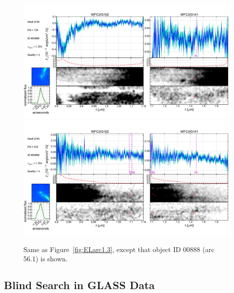 \begin{figure}
    \centering
    \includegraphics[width=\textwidth]{fig/clA2744_id888_pa135_zsQ3.pdf}\\
    \includegraphics[width=\textwidth]{fig/clA2744_id888_pa233_zsQ3.pdf}
    \caption{Same as Figure~\ref{fig:ELarc1.3}, except that object ID 00888 (arc 56.1) is shown.}
    \label{fig:ELarc56.1}
\end{figure}


\subsection{Blind Search in GLASS Data}
\label{subsec:blind}

